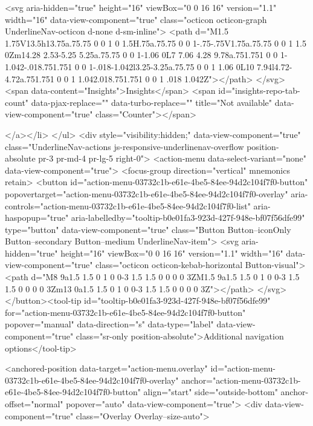               <svg aria-hidden="true" height="16" viewBox="0 0 16 16" version="1.1" width="16" data-view-component="true" class="octicon octicon-graph UnderlineNav-octicon d-none d-sm-inline">
    <path d="M1.5 1.75V13.5h13.75a.75.75 0 0 1 0 1.5H.75a.75.75 0 0 1-.75-.75V1.75a.75.75 0 0 1 1.5 0Zm14.28 2.53-5.25 5.25a.75.75 0 0 1-1.06 0L7 7.06 4.28 9.78a.751.751 0 0 1-1.042-.018.751.751 0 0 1-.018-1.042l3.25-3.25a.75.75 0 0 1 1.06 0L10 7.94l4.72-4.72a.751.751 0 0 1 1.042.018.751.751 0 0 1 .018 1.042Z"></path>
</svg>
        <span data-content="Insights">Insights</span>
          <span id="insights-repo-tab-count" data-pjax-replace="" data-turbo-replace="" title="Not available" data-view-component="true" class="Counter"></span>


    
</a></li>
</ul>
    <div style="visibility:hidden;" data-view-component="true" class="UnderlineNav-actions js-responsive-underlinenav-overflow position-absolute pr-3 pr-md-4 pr-lg-5 right-0">      <action-menu data-select-variant="none" data-view-component="true">
  <focus-group direction="vertical" mnemonics retain>
    <button id="action-menu-03732c1b-e61e-4be5-84ee-94d2c104f7f0-button" popovertarget="action-menu-03732c1b-e61e-4be5-84ee-94d2c104f7f0-overlay" aria-controls="action-menu-03732c1b-e61e-4be5-84ee-94d2c104f7f0-list" aria-haspopup="true" aria-labelledby="tooltip-b0e01fa3-923d-427f-948e-bf07f56dfe99" type="button" data-view-component="true" class="Button Button--iconOnly Button--secondary Button--medium UnderlineNav-item">  <svg aria-hidden="true" height="16" viewBox="0 0 16 16" version="1.1" width="16" data-view-component="true" class="octicon octicon-kebab-horizontal Button-visual">
    <path d="M8 9a1.5 1.5 0 1 0 0-3 1.5 1.5 0 0 0 0 3ZM1.5 9a1.5 1.5 0 1 0 0-3 1.5 1.5 0 0 0 0 3Zm13 0a1.5 1.5 0 1 0 0-3 1.5 1.5 0 0 0 0 3Z"></path>
</svg>
</button><tool-tip id="tooltip-b0e01fa3-923d-427f-948e-bf07f56dfe99" for="action-menu-03732c1b-e61e-4be5-84ee-94d2c104f7f0-button" popover="manual" data-direction="s" data-type="label" data-view-component="true" class="sr-only position-absolute">Additional navigation options</tool-tip>


<anchored-position data-target="action-menu.overlay" id="action-menu-03732c1b-e61e-4be5-84ee-94d2c104f7f0-overlay" anchor="action-menu-03732c1b-e61e-4be5-84ee-94d2c104f7f0-button" align="start" side="outside-bottom" anchor-offset="normal" popover="auto" data-view-component="true">
  <div data-view-component="true" class="Overlay Overlay--size-auto">
    
